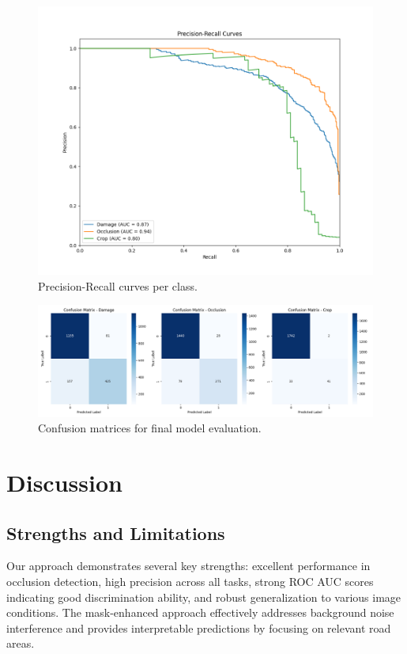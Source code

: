 \documentclass[12pt,twocolumn]{article}
\begin{document}
\begin{figure}[!htb]
  \centering
  \includegraphics[width=0.9\linewidth]{images/precision_recall_curves.png}
  \caption{Precision-Recall curves per class.}
\end{figure}

\begin{figure}[!htb]
  \centering
  \includegraphics[width=0.9\linewidth]{images/confusion_matrices.png}
  \caption{Confusion matrices for final model evaluation.}
\end{figure}

\section{Discussion}

\subsection{Strengths and Limitations}

Our approach demonstrates several key strengths: excellent performance in occlusion detection, high precision across all tasks, strong ROC AUC scores indicating good discrimination ability, and robust generalization to various image conditions. The mask-enhanced approach effectively addresses background noise interference and provides interpretable predictions by focusing on relevant road areas.
\end{document}
